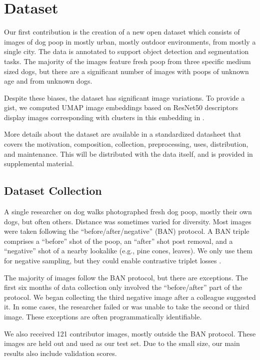 \documentclass{article}
\begin{document}
\section{Dataset}
\label{sec:dataset}

Our first contribution is the creation of a new open dataset which consists of images of dog poop in mostly
  urban, mostly outdoor environments, from mostly a single city.
The data is annotated to support object detection and segmentation tasks.
The majority of the images feature fresh poop from three specific medium sized dogs, but there are
  a significant number of images with poops of unknown age and from unknown dogs.

Despite these biases, the dataset has significant image variations.
To provide a gist, we computed UMAP \cite{mcinnes_umap_2020} image embeddings based on ResNet50
  \cite{he2016deep} descriptors display images corresponding with clusters in this embedding in
  .

More details about the dataset are available in a standardized datasheet
\cite{gebru_datasheets_2021} that covers the motivation, composition,
collection, preprocessing, uses, distribution, and maintenance. This will be
distributed with the data itself, and is provided in supplemental material.

\subsection{Dataset Collection}

A single researcher on dog walks photographed fresh dog poop, mostly their own
dogs, but often others. Distance was sometimes varied for diversity. Most
images were taken following the ``before/after/negative'' (BAN) protocol.  
A BAN triple comprises a ``before'' shot of the poop, an ``after'' shot
post removal, and a ``negative'' shot of a nearby lookalike (e.g., pine cones,
leaves).  We only use them for negative sampling, but they could enable
contrastive triplet losses \cite{schroff_facenet_2015}.

The majority of images follow the BAN protocol, but there are exceptions.
The first six months of data collection only involved the ``before/after'' part of the protocol. 
We began collecting the third negative image after a colleague suggested it.
In some cases, the researcher failed or was unable to take the second or third image.
These exceptions are often programmatically identifiable.
  
We also received 121 contributor images, mostly outside the BAN protocol.
These images are held out and used as our test set.
Due to the small size, our main results also include validation scores.
\end{document}
